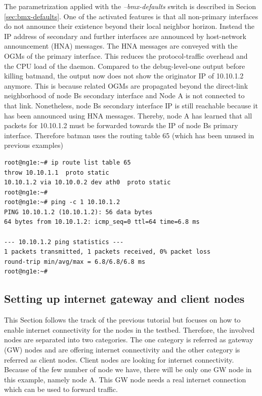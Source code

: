 \documentclass[11pt]{article}
\begin{document}
\begin{enumerate}
\begin{small}
\begin{verbatim}
\end{verbatim} \end{small}

The parametrization applied with the \emph{--bmx-defaults} switch is described in Secion \ref{sec:bmx-defaults}. 
One of the activated features is that all non-primary interfaces do not announce their existence beyond their local neighbor horizon. 
Instead the IP address of secondary and further interfaces are announced by host-network announcement (HNA) messages. 
The HNA messages are conveyed with the OGMs of the primary interface. 
This reduces the protocol-traffic overhead and the CPU load of the daemon.
%
Compared to the debug-level-one output before killing batmand, the output now does not show the originator IP of 10.10.1.2 anymore. This is because related OGMs are propagated beyond the direct-link neighborhood of node Bs secondary interface and Node A is not connected to that link. Nonetheless, node Bs secondary interface IP is still reachable because it has been announced using HNA messages. Thereby, node A has learned that all packets for 10.10.1.2 must be forwarded towards the IP of node Bs primary interface.
%
Therefore batman uses the routing table 65 (which has been unused in previous examples)

\begin{small} \begin{verbatim}
root@ng1e:~# ip route list table 65
throw 10.10.1.1  proto static
10.10.1.2 via 10.10.0.2 dev ath0  proto static
root@ng1e:~# 
root@ng1e:~# ping -c 1 10.10.1.2
PING 10.10.1.2 (10.10.1.2): 56 data bytes
64 bytes from 10.10.1.2: icmp_seq=0 ttl=64 time=6.8 ms

--- 10.10.1.2 ping statistics ---
1 packets transmitted, 1 packets received, 0% packet loss
round-trip min/avg/max = 6.8/6.8/6.8 ms
root@ng1e:~# 
\end{verbatim} \end{small}


\end{enumerate}


\subsection{Setting up internet gateway and client nodes}
\label{sec:howto-gw}

This Section follows the track of the previous tutorial but focuses on how to enable internet connectivity for the nodes in the testbed. 
Therefore, the involved nodes are separated into two categories. 
The one category is referred as gateway (GW) nodes and are offering internet connectivity and the other category is referred as client nodes. Client nodes are looking for internet connectivity. 
Because of the few number of node we have, there will be only one GW node in this example, namely node A. 
This GW node needs a real internet connection which can be used to forward traffic. 
\end{document}

